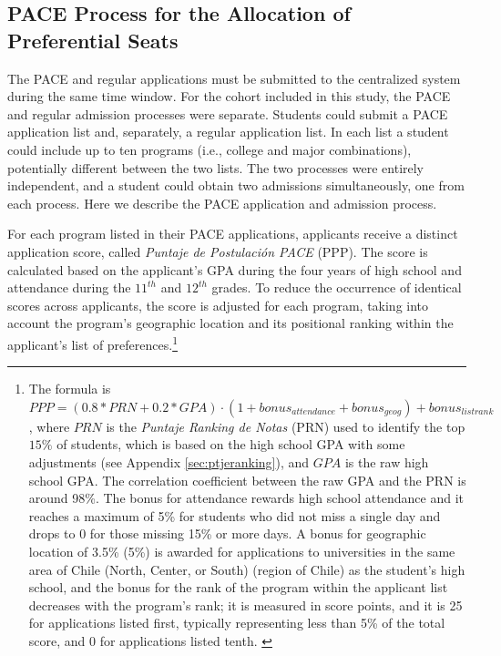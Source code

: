 \subsection{PACE Process for the Allocation of Preferential Seats}\label{sec:PACEadmissionprocess}
The PACE and regular applications must be submitted to the centralized system during the same time window. For the cohort included in this study, the PACE and regular admission processes were separate. Students could submit a PACE application list and, separately, a regular application list. In each list a student could include up to ten programs (i.e., college and major combinations), potentially different between the two lists. The two processes were entirely independent, and a student could obtain two admissions simultaneously, one from each process. Here we describe the PACE application and admission process.\par 
For each program listed in their PACE applications, applicants receive a distinct application score, called {\itshape Puntaje de Postulaci\'{o}n PACE} (PPP). The score is calculated based on the applicant's GPA during the four years of high school and attendance during the $11^{th}$ and $12^{th}$ grades. To reduce the occurrence of identical scores across applicants, the score is adjusted for each program, taking into account the program's geographic location and its positional ranking within the applicant's list of preferences.\footnote{The formula is $PPP=(0.8 * PRN + 0.2 * GPA)\cdot (1+bonus_{attendance}+bonus_{geog})+bonus_{listrank}$, where $PRN$ is the {\itshape Puntaje Ranking de Notas} (PRN) used to identify the top $15\%$ of students, which is based on the high school GPA with some adjustments (see Appendix \ref{sec:ptjeranking}), and $GPA$ is the raw high school GPA. The correlation coefficient between the raw GPA and the PRN is around 98\%.  The bonus for attendance rewards high school attendance and it reaches a maximum of 5\% for students who did not miss a single day and drops to 0 for those missing 15\% or more days. A bonus for geographic location of 3.5\% (5\%) is awarded for applications to universities in the same area of Chile (North, Center, or South) (region of Chile) as the student's high school, and the bonus for the rank of the program within the applicant list decreases with the program's rank; it is measured in score points, and it is 25 for applications listed first, typically representing less than 5\% of the total score, and 0 for applications listed tenth. \label{foot:PPPformula} }\par 

